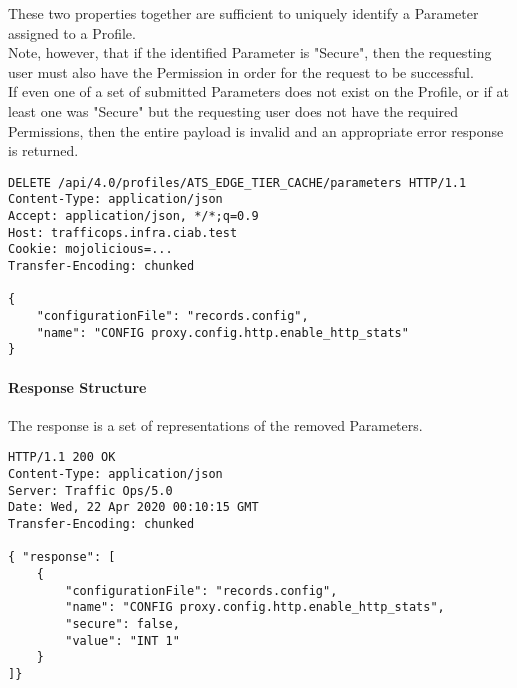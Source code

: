These two properties together are sufficient to uniquely identify a Parameter
assigned to a Profile.\\
Note, however, that if the identified Parameter is "Secure", then the requesting
user must also have the  Permission in order for the
request to be successful.\\
If even one of a set of submitted Parameters does not exist on the Profile, or
if at least one was "Secure" but the requesting user does not have the required
Permissions, then the entire payload is invalid and an appropriate error
response is returned.

\begin{codelisting}
\begin{verbatim}
DELETE /api/4.0/profiles/ATS_EDGE_TIER_CACHE/parameters HTTP/1.1
Content-Type: application/json
Accept: application/json, */*;q=0.9
Host: trafficops.infra.ciab.test
Cookie: mojolicious=...
Transfer-Encoding: chunked

{
	"configurationFile": "records.config",
	"name": "CONFIG proxy.config.http.enable_http_stats"
}
\end{verbatim}
\end{codelisting}

\paragraph{Response Structure}
The response is a set of representations of the removed Parameters.

\begin{codelisting}
\begin{verbatim}
HTTP/1.1 200 OK
Content-Type: application/json
Server: Traffic Ops/5.0
Date: Wed, 22 Apr 2020 00:10:15 GMT
Transfer-Encoding: chunked

{ "response": [
	{
		"configurationFile": "records.config",
		"name": "CONFIG proxy.config.http.enable_http_stats",
		"secure": false,
		"value": "INT 1"
	}
]}

\end{verbatim}
\end{codelisting}
